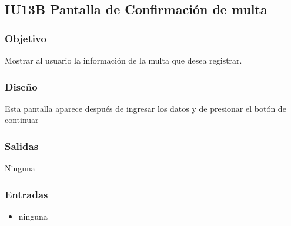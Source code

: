 \newpage
\subsection{IU13B Pantalla de Confirmación de multa}

\subsubsection{Objetivo}
	Mostrar al usuario la información de la multa que desea registrar. 

\subsubsection{Diseño}
	Esta pantalla aparece después de ingresar los datos y de presionar el botón de continuar


\subsubsection{Salidas}
	\begin{Citemize}
	        \item Ninguna
	\end{Citemize}
	
\subsubsection{Entradas}
		\begin{itemize}
        	\item ninguna
        \end{itemize}  

